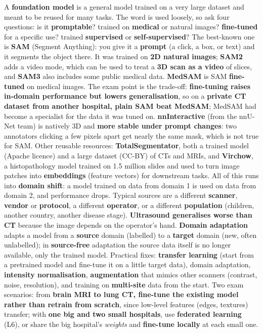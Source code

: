 \documentclass[a4paper]{article}
\newcommand{\K}[1]{\textcolor{kg}{\textbf{#1}}}
\newcommand{\E}[1]{\textcolor{ep}{#1}}
\newcommand{\T}[1]{\textcolor{tr}{\textbf{#1}}}
\begin{document}
A \K{foundation model} is a general model trained on a very large dataset and meant to be reused for many tasks. The word is used loosely, so ask four questions: is it \K{promptable}? trained on \K{medical} or natural images? \K{fine-tuned} for a specific use? trained \K{supervised} or \K{self-supervised}? The best-known one is \K{SAM} (Segment Anything): you give it a \K{prompt} (a click, a box, or text) and it segments the object there. It was trained on \T{2D natural images}; \K{SAM2} adds a video mode, which can be used to treat a \K{3D scan as a video} of slices, and \K{SAM3} also includes some public medical data. \K{MedSAM} is SAM \K{fine-tuned} on medical images. The exam point is the trade-off: \T{fine-tuning raises in-domain performance but lowers generalisation}, so on a \T{private CT dataset from another hospital, plain SAM beat MedSAM}; MedSAM had become a specialist for the data it was tuned on. \K{nnInteractive} (from the nnU-Net team) is natively 3D and \K{more stable under prompt changes}: two annotators clicking a few pixels apart get nearly the same mask, which is not true for SAM. Other reusable resources: \K{TotalSegmentator}, both a trained model (Apache licence) and a large dataset (CC-BY) of CTs and MRIs, and \K{Virchow}, a histopathology model trained on 1.5 million slides and used to turn image patches into \K{embeddings} (feature vectors) for downstream tasks. All of this runs into \K{domain shift}: a model trained on data from domain 1 is used on data from domain 2, and performance drops. Typical sources are a different \K{scanner}, \K{vendor} or \K{protocol}, a different \K{operator}, or a different \K{population} (\E{children, another country, another disease stage}). \T{Ultrasound generalises worse than CT} because the image depends on the operator's hand.
\K{Domain adaptation} adapts a model from a \K{source} domain (labelled) to a \K{target} domain (new, often unlabelled); in \K{source-free} adaptation the source data itself is no longer available, only the trained model. Practical fixes: \K{transfer learning} (start from a pretrained model and fine-tune it on a little target data), domain adaptation, \K{intensity normalisation}, \K{augmentation} that mimics other scanners (contrast, noise, resolution), and training on \K{multi-site} data from the start. Two exam scenarios: from \T{brain MRI to lung CT, fine-tune the existing model rather than retrain from scratch}, since low-level features (edges, textures) transfer; with \T{one big and two small hospitals}, use \K{federated learning} (L6), or share the big hospital's \emph{weights} and \K{fine-tune locally} at each small one.
\end{document}
